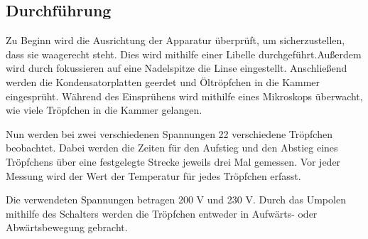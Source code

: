 \subsection{Durchführung}
\label{subsec:Durchführung}

Zu Beginn wird die Ausrichtung der Apparatur überprüft, um sicherzustellen, dass sie waagerecht steht. Dies wird mithilfe einer 
Libelle durchgeführt.Außerdem wird durch fokussieren auf eine Nadelspitze die Linse eingestellt.
Anschließend werden die Kondensatorplatten geerdet und Öltröpfchen in die Kammer eingesprüht. Während des 
Einsprühens wird mithilfe eines Mikroskops überwacht, wie viele Tröpfchen in die Kammer gelangen.

Nun werden bei zwei verschiedenen Spannungen 22 verschiedene Tröpfchen beobachtet. Dabei werden die Zeiten für den Aufstieg 
und den Abstieg eines Tröpfchens über eine festgelegte Strecke jeweils drei Mal gemessen. Vor jeder Messung wird der Wert 
der Temperatur für jedes Tröpfchen erfasst.

Die verwendeten Spannungen betragen 200 V und 230 V. Durch das Umpolen mithilfe des Schalters werden die Tröpfchen entweder 
in Aufwärts- oder Abwärtsbewegung gebracht.


